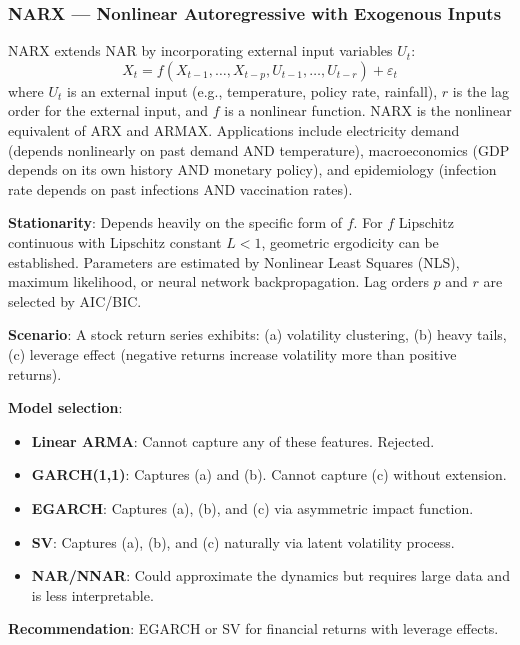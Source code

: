 \documentclass[11pt,a4paper]{article}
\begin{document}
\subsubsection{NARX --- Nonlinear Autoregressive with Exogenous Inputs}

NARX extends NAR by incorporating external input variables $U_t$:
\[
X_t = f(X_{t-1}, \ldots, X_{t-p}, U_{t-1}, \ldots, U_{t-r}) + \varepsilon_t
\]
where $U_t$ is an external input (e.g., temperature, policy rate, rainfall), $r$ is the lag order for the external input, and $f$ is a nonlinear function. NARX is the nonlinear equivalent of ARX and ARMAX. Applications include electricity demand (depends nonlinearly on past demand AND temperature), macroeconomics (GDP depends on its own history AND monetary policy), and epidemiology (infection rate depends on past infections AND vaccination rates).

\textbf{Stationarity}: Depends heavily on the specific form of $f$. For $f$ Lipschitz continuous with Lipschitz constant $L < 1$, geometric ergodicity can be established. Parameters are estimated by Nonlinear Least Squares (NLS), maximum likelihood, or neural network backpropagation. Lag orders $p$ and $r$ are selected by AIC/BIC.

\begin{tcolorbox}[colback=green!5!white,colframe=green!75!black,title=\textbf{Worked Example 19: Nonlinear Model Comparison}]
\textbf{Scenario}: A stock return series exhibits: (a) volatility clustering, (b) heavy tails, (c) leverage effect (negative returns increase volatility more than positive returns).

\textbf{Model selection}:
\begin{itemize}
    \item \textbf{Linear ARMA}: Cannot capture any of these features. Rejected.
    \item \textbf{GARCH(1,1)}: Captures (a) and (b). Cannot capture (c) without extension.
    \item \textbf{EGARCH}: Captures (a), (b), and (c) via asymmetric impact function.
    \item \textbf{SV}: Captures (a), (b), and (c) naturally via latent volatility process.
    \item \textbf{NAR/NNAR}: Could approximate the dynamics but requires large data and is less interpretable.
\end{itemize}
\textbf{Recommendation}: EGARCH or SV for financial returns with leverage effects.
\end{tcolorbox}
\end{document}
